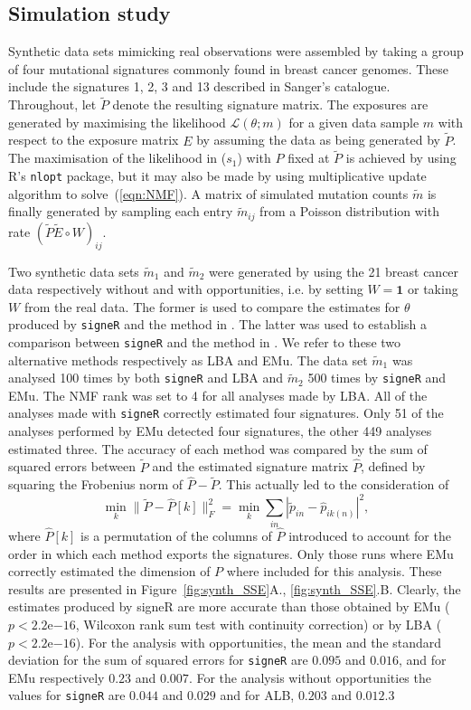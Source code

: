 \documentclass{bioinfo}
\begin{document}
\subsection{Simulation study}
Synthetic data sets mimicking real observations were assembled by
taking a group of four mutational signatures commonly found in breast
cancer genomes. These include the signatures 1, 2, 3 and 13 described
in Sanger's catalogue. Throughout, let $\widetilde P$ denote the
resulting signature matrix.  The exposures are generated by maximising
the likelihood $\mathcal L(\theta; m)$ for a given data sample $m$
with respect to the exposure matrix $E$ by assuming the data as being
generated by $\widetilde P$. The maximisation of the likelihood in
($s_1$) with $P$ fixed at $\widetilde P$ is achieved by using R's 
\texttt{nlopt} package, but it may also be made by using
\cite{LS} multiplicative update algorithm to solve~(\ref{eqn:NMF}). A
matrix of simulated mutation counts $\widetilde m$ is finally
generated by sampling each entry $\widetilde m_{ij}$ from a Poisson
distribution with rate $(\widetilde P\widetilde E\circ W)_{ij}$.

Two synthetic data sets $\widetilde m_1$ and $\widetilde m_2$ were
generated by using the 21 breast cancer data respectively without and
with opportunities, i.e. by setting $W=\mathbf{1}$  or taking $W$
from the real data. The former is used to compare the estimates for 
 $\theta$ produced by
\texttt{signeR} and the method in \cite{A}. The latter was used to
establish a comparison between \texttt{signeR} and the method in
\cite{FICMV}. We refer to these two alternative methods respectively 
as LBA and EMu. The data set $\widetilde m_1$ was analysed 100 times
by both \texttt{signeR} and LBA and $\widetilde m_2$ 500 times by
\texttt{signeR} and EMu. The NMF rank was set to 4 for all analyses
made by LBA. All of the analyses made with \texttt{signeR}
correctly estimated four signatures. Only 51 of the analyses
performed by EMu detected four signatures, the other 449 analyses
estimated three.  The accuracy of each method was compared by the sum
of squared errors between $\widetilde P$ and the estimated signature
matrix $\widehat P$, defined by squaring the Frobenius norm of
$\widehat P - \widetilde P$. This actually led to the consideration of
\[
   \min_k 
   \big\|
       \widetilde P - \widehat P[k]
   \big\|_F^2 
  = 
   \min_k \sum_{in}
     |\widetilde p_{in} - \widehat p_{ik(n)}|^2,
\]
where $\widehat P[k]$ is a permutation of the columns of $\widehat P$
introduced to account for the order in which each method exports the 
signatures. Only those runs where EMu correctly estimated the
dimension of $P$ where included for this analysis. These results are
presented in Figure~\ref{fig:synth_SSE}A., \ref{fig:synth_SSE}.B.
Clearly, the estimates produced by signeR are more accurate than those
obtained by EMu ($p < 2.2$e$-16$, Wilcoxon rank sum test with
continuity correction) or by LBA ($p < 2.2$e$-16$). For the analysis
with opportunities, the mean and the standard deviation for the sum of
squared errors for \texttt{signeR} are $0.095$ and $0.016$, and for
EMu respectively $0.23$ and $0.007$. For the analysis without
opportunities the values for \texttt{signeR} are $0.044$ and $0.029$
and for ALB, $0.203$ and $0.012$.3
\end{document}
